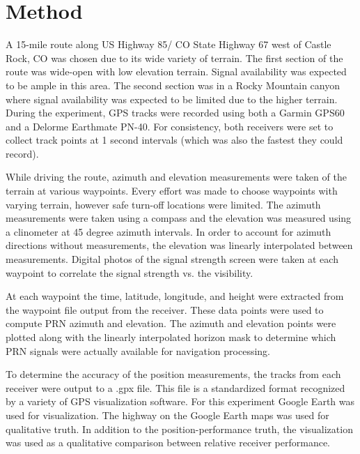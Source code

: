 \documentclass[]{aiaa-tc}%
\begin{document}
	\section{Method}
	
	\noindent A 15-mile route along US Highway 85/ CO State Highway 67 west of Castle Rock, CO was chosen due to its wide variety of terrain. The first section of the route was wide-open with low elevation terrain. Signal availability was expected to be ample in this area. The second section was in a Rocky Mountain canyon where signal availability was expected to be limited due to the higher terrain. During the experiment, GPS tracks were recorded using both a Garmin GPS60 and a Delorme Earthmate PN-40. For consistency, both receivers were set to collect track points at 1 second intervals (which was also the fastest they could record).
	
	\vspace{5 mm}
	
	\noindent While driving the route, azimuth and elevation measurements were taken of the terrain at various waypoints. Every effort was made to choose waypoints with varying terrain, however safe turn-off locations were limited. The azimuth measurements were taken using a compass and the elevation was measured using a clinometer at 45 degree azimuth intervals. In order to account for azimuth directions without measurements, the elevation was linearly interpolated between measurements. Digital photos of the signal strength screen were taken at each waypoint to correlate the signal strength vs. the visibility.
	
	\vspace{5 mm}
	
	\noindent At each waypoint the time, latitude, longitude, and height were extracted from the waypoint file output from the receiver. These data points were used to compute PRN azimuth and elevation. The azimuth and elevation points were plotted along with the linearly interpolated horizon mask to determine which PRN signals were actually available for navigation processing. 
	
	\vspace{5 mm} 
	
	\noindent To determine the accuracy of the position measurements, the tracks from each receiver were output to a .gpx file. This file is a standardized format recognized by a variety of GPS visualization software. For this experiment Google Earth was used for visualization. The highway on the Google Earth maps was used for qualitative truth. In addition to the position-performance truth, the visualization was used as a qualitative comparison between relative receiver performance. 
	
\end{document}
